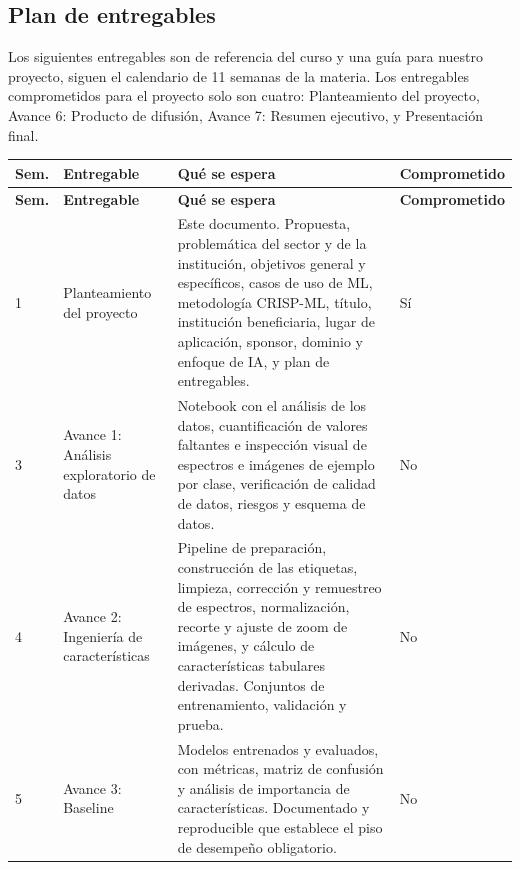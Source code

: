 \documentclass[12pt]{article}
\begin{document}
\subsection{Plan de entregables}

Los siguientes entregables son de referencia del curso y una guía para nuestro proyecto, siguen el calendario de 11 semanas de la materia. Los entregables comprometidos para el proyecto solo son cuatro: Planteamiento del proyecto, Avance 6: Producto de difusión, Avance 7: Resumen ejecutivo, y Presentación final.

\small

\begin{longtable}{|>{\raggedright\arraybackslash}p{}|>{\raggedright\arraybackslash}p{}|>{\raggedright\arraybackslash}p{}|>{\raggedright\arraybackslash}p{}|} \hline
\textbf{Sem.} & \textbf{Entregable} & \textbf{Qué se espera} & \textbf{Comprometido} \\ \hline \endfirsthead
\hline
\textbf{Sem.} & \textbf{Entregable} & \textbf{Qué se espera} & \textbf{Comprometido} \\ \hline \endhead

1 &
Planteamiento del proyecto &
Este documento. Propuesta, problemática del sector y de la institución, objetivos general y específicos, casos de uso de ML, metodología CRISP-ML, título, institución beneficiaria, lugar de aplicación, sponsor, dominio y enfoque de IA, y plan de entregables. &
Sí
\\ \hline

3 &
Avance 1: Análisis exploratorio de datos &
Notebook con el análisis de los datos, cuantificación de valores faltantes e inspección visual de espectros e imágenes de ejemplo por clase, verificación de calidad de datos, riesgos y esquema de datos. &
No
\\ \hline

4 &
Avance 2: Ingeniería de características &
Pipeline de preparación, construcción de las etiquetas, limpieza, corrección y remuestreo de espectros, normalización, recorte y ajuste de zoom de imágenes, y cálculo de características tabulares derivadas. Conjuntos de entrenamiento, validación y prueba. &
No
\\ \hline

5 &
Avance 3: Baseline &
Modelos entrenados y evaluados, con métricas, matriz de confusión y análisis de importancia de características. Documentado y reproducible que establece el piso de desempeño obligatorio. &
No
\\ \hline


\end{longtable}
\end{document}

